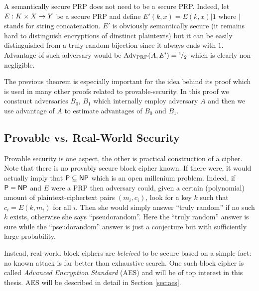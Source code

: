 \begin{note}
	A semantically secure PRP does not need to be a secure PRP. Indeed, let $E: K\times X\rightarrow Y$ be a secure PRP and define $E'(k,x) = E(k,x)|1$ where $|$ stands for string concatenation. $E'$ is obviously semantically secure (it remains hard to distinguish encryptions of dinstinct plaintexts) but it can be easily distinguished from a truly random bijection since it always ends with $1$. Advantage of such adversary would be $\operatorname*{Adv_{PRP}}(A,E') = {}^{1}\!/_{2}$ which is clearly non-negligible.
\end{note}

The previous theorem is especially important for the idea behind its proof which is used in many other proofs related to provable-security. In this proof we construct adversaries $B_0$, $B_1$ which internally employ adversary $A$ and then we use advantage of $A$ to estimate advantages of $B_0$ and $B_1$.


\subsection{Provable vs. Real-World Security}

Provable security is one aspect, the other is practical construction of a cipher. Note that there is no provably secure block cipher known. If there were, it would actually imply that $\mathsf{P} \subsetneq \mathsf{NP}$ which is an open millenium problem. Indeed, if $\mathsf{P} = \mathsf{NP}$ and $E$ were a PRP then adversary could, given a certain (polynomial) amount of plaintext-ciphertext pairs $(m_i,c_i)$, look for a key $k$ such that $c_i = E(k,m_i)$ for all $i$. Then she would simply answer ``truly random'' if no such $k$ exists, otherwise she says ``pseudorandom''. Here the ``truly random'' answer is sure while the ``pseudorandom'' answer is just a conjecture but with sufficiently large probability.

Instead, real-world block ciphers are {\em beleived} to be secure based on a simple fact: no known attack is far better than exhaustive search. One such block cipher is called {\em Advanced Encryption Standard} (AES) and will be of top interest in this thesis. AES will be described in detail in Section \ref{sec:aes}.


